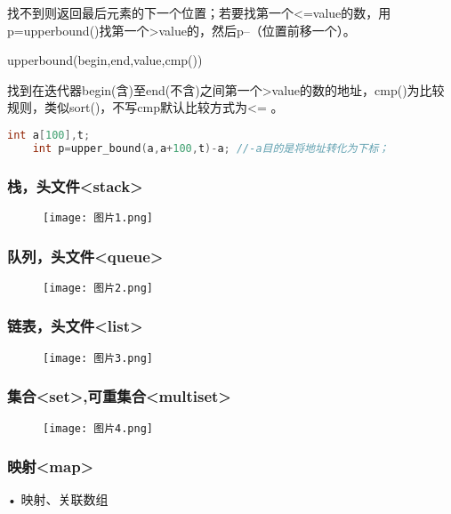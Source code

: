 \documentclass[UTF8]{ctexart}
\begin{document}
找不到则返回最后元素的下一个位置；若要找第一个<=value的数，用p=upper\textunderscore bound()找第一个>value的，然后p--（位置前移一个）。

upper\textunderscore bound(begin,end,value,cmp())

找到在迭代器begin(含)至end(不含)之间第一个>value的数的地址，cmp()为比较规则，类似sort()，不写cmp默认比较方式为<= 。
\begin{lstlisting}[language = C,basicstyle=\small\ttfamily]
    int a[100],t;
    int p=upper_bound(a,a+100,t)-a; //-a目的是将地址转化为下标；
\end{lstlisting}

\subsubsection{栈，头文件<stack>}
\begin{figure}[H]
    \centering
    \texttt{[image: 图片1.png]}
    \label{fig:enter-label}
\end{figure}

\subsubsection{队列，头文件<queue>}
\begin{figure}[H]
    \centering
    \texttt{[image: 图片2.png]}
    \label{fig:enter-label}
\end{figure}

\subsubsection{链表，头文件<list>}
\begin{figure}[H]
    \centering
    \texttt{[image: 图片3.png]}
    \label{fig:enter-label}
\end{figure}

\subsubsection{集合<set>,可重集合<multiset>}
\begin{figure}[H]
    \centering
    \texttt{[image: 图片4.png]}
    \label{fig:enter-label}
\end{figure}

\subsubsection{映射<map>}
• 映射、关联数组 
\end{document}
